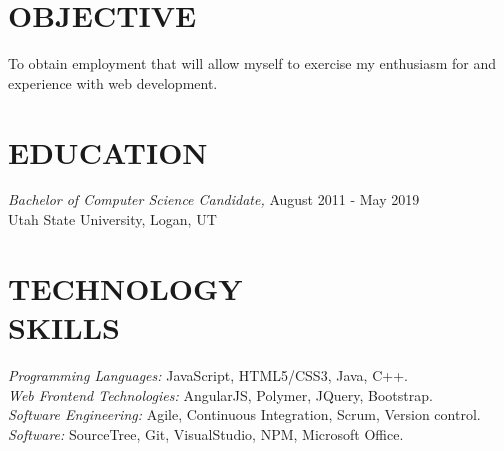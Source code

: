 \documentclass[margin, 10pt]{res} %
\begin{document}
\begin{resume}


\section{OBJECTIVE}

To obtain employment that will allow myself to exercise my enthusiasm for and experience with web development.


\section{EDUCATION}

{\sl Bachelor of Computer Science Candidate,}  \hfill August 2011 - May 2019 \\
Utah State University, Logan, UT


\section{TECHNOLOGY \\ SKILLS}

{\sl Programming Languages:} JavaScript, HTML5/CSS3, Java, C++. \\
{\sl Web Frontend Technologies:} AngularJS, Polymer, JQuery, Bootstrap. \\
{\sl Software Engineering:} Agile, Continuous Integration, Scrum, Version control. \\
{\sl Software:} SourceTree, Git, VisualStudio, NPM, Microsoft Office.



\end{resume}
\end{document}
